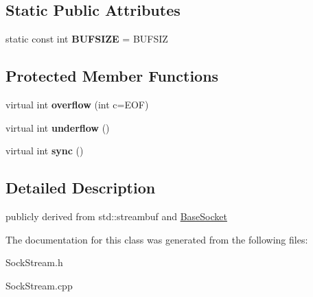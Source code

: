 \subsection*{Static Public Attributes}
\begin{CompactItemize}
\item 
\hypertarget{classsocketpp_1_1SockBuf_2b90c5705f30dd3fda03a6eb13378e15}{
static const int \textbf{BUFSIZE} = BUFSIZ}
\label{classsocketpp_1_1SockBuf_2b90c5705f30dd3fda03a6eb13378e15}

\end{CompactItemize}
\subsection*{Protected Member Functions}
\begin{CompactItemize}
\item 
\hypertarget{classsocketpp_1_1SockBuf_5a1f6d2304fe83a8602e07d12032b2c7}{
virtual int \textbf{overflow} (int c=EOF)}
\label{classsocketpp_1_1SockBuf_5a1f6d2304fe83a8602e07d12032b2c7}

\item 
\hypertarget{classsocketpp_1_1SockBuf_34ccc364e9f20a25199bea9fdde19bdd}{
virtual int \textbf{underflow} ()}
\label{classsocketpp_1_1SockBuf_34ccc364e9f20a25199bea9fdde19bdd}

\item 
\hypertarget{classsocketpp_1_1SockBuf_33c3d2907102b5b38daca32fb2c12591}{
virtual int \textbf{sync} ()}
\label{classsocketpp_1_1SockBuf_33c3d2907102b5b38daca32fb2c12591}

\end{CompactItemize}


\subsection{Detailed Description}
publicly derived from std::streambuf and \hyperlink{classsocketpp_1_1BaseSocket}{BaseSocket} 

The documentation for this class was generated from the following files:\begin{CompactItemize}
\item 
SockStream.h\item 
SockStream.cpp\end{CompactItemize}
